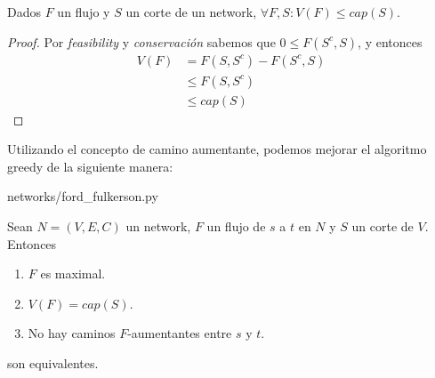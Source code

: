 \begin{corollary}\label{cutcapbound}
  Dados $F$ un flujo y $S$ un corte de un network,
  $\forall F, S \colon V(F) \le cap(S)$.
\end{corollary}

\begin{proof}
  Por \emph{feasibility} y \emph{conservación} sabemos que
  $0 \le F(S^c, S)$, y entonces
  \begin{align}
    V(F)
    &= F(S, S^c) - F(S^c, S)\\
	  &\le F(S, S^c)\\
    &\le cap(S)
  \end{align}
\end{proof}

\begin{definition}
  Utilizando el concepto de camino aumentante, podemos mejorar el
  algoritmo greedy de la siguiente manera:
  
  \begin{lstinputlisting}[language=python]{networks/ford_fulkerson.py}
  \end{lstinputlisting}
\end{definition}

\begin{theorem}\label{maxflowmincut}
  Sean $N = (V,E,C)$ un network, $F$ un flujo de $s$ a $t$ en $N$ y
  $S$ un corte de $V$. Entonces
  \begin{enumerate}
    \item $F$ es maximal.
    \item $V(F) = cap(S)$.
    \item No hay caminos $F$-aumentantes entre $s$ y $t$.
  \end{enumerate}
  son equivalentes.
\end{theorem}

